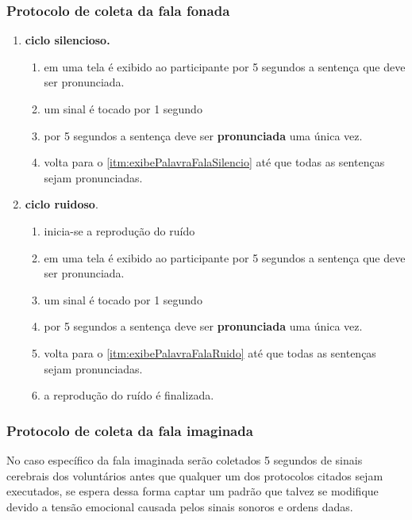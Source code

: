 				
		    \subsubsection{Protocolo de coleta da fala fonada}
		    	\label{sec:coletaFalaFonada}
			    \begin{enumerate}
			    	\item \textbf{ciclo silencioso.}
			    	\begin{enumerate}
			    		\item em uma tela é exibido ao participante por 5 segundos a sentença que deve ser pronunciada.\label{itm:exibePalavraFalaSilencio}
			    		\item um sinal é tocado por 1 segundo
			    		\item por 5 segundos a sentença deve ser \textbf{pronunciada} uma única vez.
			    		\item volta para o \autoref{itm:exibePalavraFalaSilencio} até que todas as sentenças sejam pronunciadas.
			    	\end{enumerate}
			    	
			    	\item \textbf{ciclo ruidoso}.
			    	\begin{enumerate}
			    		\item inicia-se a reprodução do ruído
			    		\item em uma tela é exibido ao participante por 5 segundos a sentença que deve ser pronunciada.\label{itm:exibePalavraFalaRuido}
			    		\item um sinal é tocado por 1 segundo
			    		\item por 5 segundos a sentença deve ser \textbf{pronunciada} uma única vez.
			    		\item volta para o \autoref{itm:exibePalavraFalaRuido} até que todas as sentenças sejam pronunciadas.
			    		\item a reprodução do ruído é finalizada.
			    	\end{enumerate}
			    \end{enumerate}
		    
		    \subsubsection{Protocolo de coleta da fala imaginada}
		    	\label{sec:coletaFalaImaginada}
  			    \par No caso específico da fala imaginada serão coletados 5 segundos de sinais cerebrais dos voluntários antes que qualquer um dos protocolos citados sejam executados, se espera dessa forma captar um padrão que talvez se modifique devido a tensão emocional causada pelos sinais sonoros e ordens dadas.
  			    
